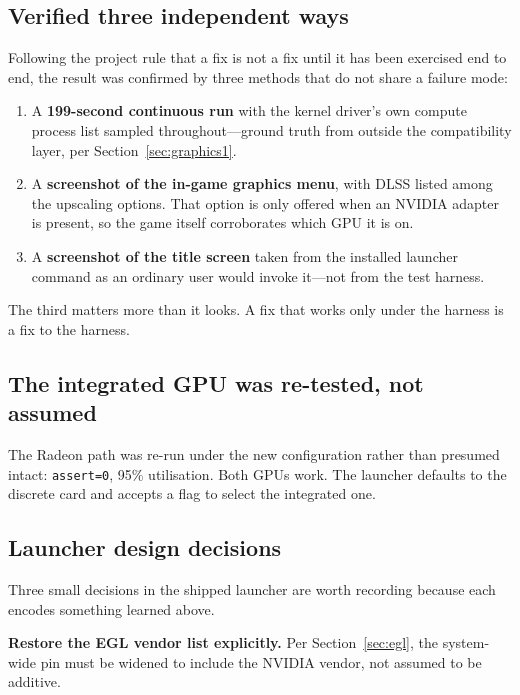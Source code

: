 \subsection{Verified three independent ways}

Following the project rule that a fix is not a fix until it has been exercised
end to end, the result was confirmed by three methods that do not share a failure
mode:

\begin{enumerate}
\item A \textbf{199-second continuous run} with the kernel driver's own compute
      process list sampled throughout---ground truth from outside the
      compatibility layer, per Section~\ref{sec:graphics1}.
\item A \textbf{screenshot of the in-game graphics menu}, with DLSS listed among
      the upscaling options. That option is only offered when an NVIDIA adapter
      is present, so the game itself corroborates which GPU it is on.
\item A \textbf{screenshot of the title screen} taken from the installed
      launcher command as an ordinary user would invoke it---not from the test
      harness.
\end{enumerate}

The third matters more than it looks. A fix that works only under the harness is
a fix to the harness.

\subsection{The integrated GPU was re-tested, not assumed}

The Radeon path was re-run under the new configuration rather than presumed
intact: \verb|assert=0|, 95\% utilisation. Both GPUs work. The launcher defaults
to the discrete card and accepts a flag to select the integrated one.

\subsection{Launcher design decisions}

Three small decisions in the shipped launcher are worth recording because each
encodes something learned above.

\textbf{Restore the EGL vendor list explicitly.} Per Section~\ref{sec:egl}, the
system-wide pin must be widened to include the NVIDIA vendor, not assumed to be
additive.

